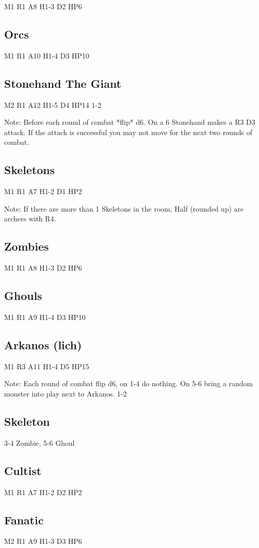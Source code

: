 \documentclass[a6paper,hidelinks]{article}
\begin{document}
M1 R1 A8 H1-3 D2 HP6

\subsection{Orcs}
M1 R1 A10 H1-4 D3 HP10

\subsection{Stonehand The Giant}
M2 R1 A12 H1-5 D4 HP14 1-2

Note: Before each round of combat *flip* d6. On a 6 Stonehand makes a R3 D3 attack. If the attack is successful you may not move for the next two rounds of combat.

\subsection{Skeletons}
M1 R1 A7 H1-2 D1 HP2

Note: If there are more than 1 Skeletons in the room, Half (rounded up) are archers with R4.

\subsection{Zombies}
M1 R1 A8 H1-3 D2 HP6

\subsection{Ghouls}
M1 R1 A9 H1-4 D3 HP10

\subsection{Arkanos (lich)}
M1 R3 A11 H1-4 D5 HP15

Note: Each round of combat flip d6, on 1-4 do nothing. On 5-6 bring a random 
monster into play next to Arkanos. 1-2

\subsection{Skeleton}
3-4 Zombie, 5-6 Ghoul

\subsection{Cultist}
M1 R1 A7 H1-2 D2 HP2

\subsection{Fanatic}
M2 R1 A9 H1-3 D3 HP6
\end{document}
